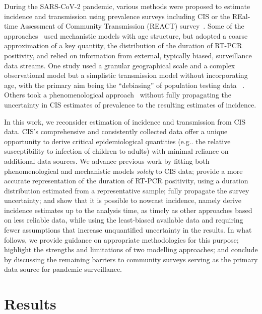 \documentclass[9pt,twocolumn,twoside]{pnas-new}
\makeatletter
\DeclareRobustCommand\onedot{\futurelet\@let@token\@onedot}
\def\@onedot{\ifx\@let@token.\else.\null\fi\xspace}
\def\eg{e.g\onedot} \def\Eg{{E.g}\onedot}
\makeatother
\begin{document}
During the SARS-CoV-2 pandemic, various methods were proposed to estimate incidence and transmission using prevalence surveys including CIS or the REal-time Assessment of Community Transmission (REACT) survey~\citep{rileyResurgence,rileyREACT}. Some of the approaches~\citep{daviesAssociation,ironsEstimating,knockKey,pooleyEstimation,birrellRTM2} used mechanistic models with age structure, but adopted a coarse approximation of a key quantity, the distribution of the duration of RT-PCR positivity, and relied on information from external, typically biased, surveillance data streams.
One study used a granular geographical scale and a complex observational model but a simplistic transmission model without incorporating age, with the primary aim being the ``debiasing'' of population testing data ~\citep{nicholsonImproving}.
Others took a phenomenological approach~\citep{abbottCISincidence,colmanAscertainment,mccabeCISincidence,ealesAppropriately} without fully propagating the uncertainty in CIS estimates of prevalence to the resulting estimates of incidence.

In this work, we reconsider estimation of incidence and transmission from CIS data. CIS's comprehensive and consistently collected data offer a unique opportunity to derive critical epidemiological quantities (\eg the relative susceptibility to infection of children to adults) with minimal reliance on additional data sources. We advance previous work by fitting  both phenomenological and mechanistic models {\it solely} to CIS data; provide a more accurate representation of the duration of RT-PCR positivity, using a duration distribution estimated from a representative sample;  fully propagate the survey uncertainty; and show that it is possible to nowcast incidence, namely derive incidence estimates up to the analysis time, as timely as other approaches based on less reliable data, while using the least-biased available data and requiring fewer assumptions that increase unquantified uncertainty in the results.
In what follows, we provide guidance on appropriate methodologies for this purpose;  highlight the strengths and limitations of two modelling approaches; and conclude by discussing the remaining barriers to community surveys serving as the primary data source for pandemic surveillance.

\section*{Results}
\end{document}
